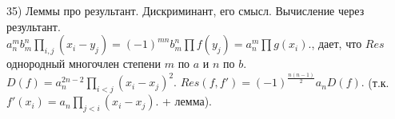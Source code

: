 35) Леммы про результант. Дискриминант, его смысл. Вычисление через результант.\\
$a_n^mb_m^n \prod_{i,j} (x_i-y_j)=(-1)^{mn}b_m^n \prod f(y_j)=a_n^m \prod g(x_i).$, дает, что $Res$ однородный многочлен степени $m$ по $a$ и $n$ по $b$. $D(f)=a_n^{2n-2}\prod_{i < j} (x_i-x_j)^2.$ $Res(f,f')=(-1)^{\frac{n(n-1)}{2}} a_n D(f).$ (т.к. $f'(x_i)=a_n\prod_{j < i}(x_i-x_j).$ + лемма).
\\

